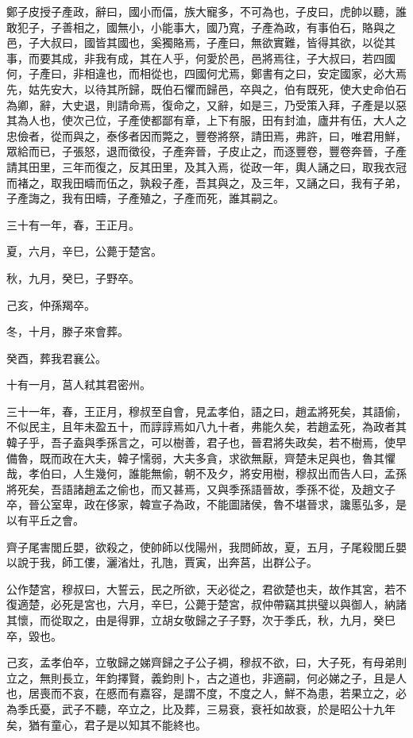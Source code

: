 \begin{pinyinscope}
鄭子皮授子產政，辭曰，國小而偪，族大寵多，不可為也，子皮曰，虎帥以聽，誰敢犯子，子善相之，國無小，小能事大，國乃寬，子產為政，有事伯石，賂與之邑，子大叔曰，國皆其國也，奚獨賂焉，子產曰，無欲實難，皆得其欲，以從其事，而要其成，非我有成，其在人乎，何愛於邑，邑將焉往，子大叔曰，若四國何，子產曰，非相違也，而相從也，四國何尤焉，鄭書有之曰，安定國家，必大焉先，姑先安大，以待其所歸，既伯石懼而歸邑，卒與之，伯有既死，使大史命伯石為卿，辭，大史退，則請命焉，復命之，又辭，如是三，乃受策入拜，子產是以惡其為人也，使次己位，子產使都鄙有章，上下有服，田有封洫，廬井有伍，大人之忠儉者，從而與之，泰侈者因而斃之，豐卷將祭，請田焉，弗許，曰，唯君用鮮，眾給而已，子張怒，退而徵役，子產奔晉，子皮止之，而逐豐卷，豐卷奔晉，子產請其田里，三年而復之，反其田里，及其入焉，從政一年，輿人誦之曰，取我衣冠而褚之，取我田疇而伍之，孰殺子產，吾其與之，及三年，又誦之曰，我有子弟，子產誨之，我有田疇，子產殖之，子產而死，誰其嗣之。

三十有一年，春，王正月。

夏，六月，辛巳，公薨于楚宮。

秋，九月，癸巳，子野卒。

己亥，仲孫羯卒。

冬，十月，滕子來會葬。

癸酉，葬我君襄公。

十有一月，莒人弒其君密州。

三十一年，春，王正月，穆叔至自會，見孟孝伯，語之曰，趙孟將死矣，其語偷，不似民主，且年未盈五十，而諄諄焉如八九十者，弗能久矣，若趙孟死，為政者其韓子乎，吾子盍與季孫言之，可以樹善，君子也，晉君將失政矣，若不樹焉，使早備魯，既而政在大夫，韓子懦弱，大夫多貪，求欲無厭，齊楚未足與也，魯其懼哉，孝伯曰，人生幾何，誰能無偷，朝不及夕，將安用樹，穆叔出而告人曰，孟孫將死矣，吾語諸趙孟之偷也，而又甚焉，又與季孫語晉故，季孫不從，及趙文子卒，晉公室卑，政在侈家，韓宣子為政，不能圖諸侯，魯不堪晉求，讒慝弘多，是以有平丘之會。

齊子尾害閭丘嬰，欲殺之，使帥師以伐陽州，我問師故，夏，五月，子尾殺閭丘嬰以說于我，師工僂，灑渻灶，孔虺，賈寅，出奔莒，出群公子。

公作楚宮，穆叔曰，大誓云，民之所欲，天必從之，君欲楚也夫，故作其宮，若不復適楚，必死是宮也，六月，辛巳，公薨于楚宮，叔仲帶竊其拱璧以與御人，納諸其懷，而從取之，由是得罪，立胡女敬歸之子子野，次于季氏，秋，九月，癸巳卒，毀也。

己亥，孟孝伯卒，立敬歸之娣齊歸之子公子裯，穆叔不欲，曰，大子死，有母弟則立之，無則長立，年鈞擇賢，義鈞則卜，古之道也，非適嗣，何必娣之子，且是人也，居喪而不哀，在慼而有嘉容，是謂不度，不度之人，鮮不為患，若果立之，必為季氏憂，武子不聽，卒立之，比及葬，三易衰，衰衽如故衰，於是昭公十九年矣，猶有童心，君子是以知其不能終也。


\end{pinyinscope}
